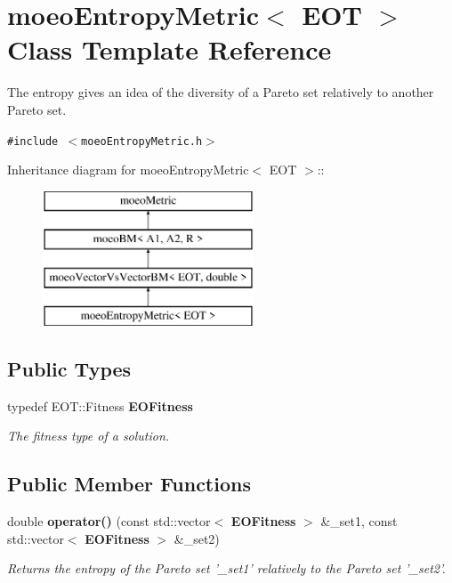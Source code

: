 \section{moeo\-Entropy\-Metric$<$ EOT $>$ Class Template Reference}
\label{classmoeoEntropyMetric}
The entropy gives an idea of the diversity of a Pareto set relatively to another Pareto set.  


{\tt \#include $<$moeo\-Entropy\-Metric.h$>$}

Inheritance diagram for moeo\-Entropy\-Metric$<$ EOT $>$::\begin{figure}[H]
\begin{center}
\leavevmode
\includegraphics[height=4cm]{classmoeoEntropyMetric}
\end{center}
\end{figure}
\subsection*{Public Types}
\begin{CompactItemize}
\item 
typedef EOT::Fitness {\bf EOFitness}\label{classmoeoEntropyMetric_306b72d2236de1ecbae986c65490a8fe}

\begin{CompactList}\small\item\em The fitness type of a solution. \item\end{CompactList}\end{CompactItemize}
\subsection*{Public Member Functions}
\begin{CompactItemize}
\item 
double {\bf operator()} (const std::vector$<$ {\bf EOFitness} $>$ \&\_\-set1, const std::vector$<$ {\bf EOFitness} $>$ \&\_\-set2)
\begin{CompactList}\small\item\em Returns the entropy of the Pareto set '\_\-set1' relatively to the Pareto set '\_\-set2'. \item\end{CompactList}\end{CompactItemize}
